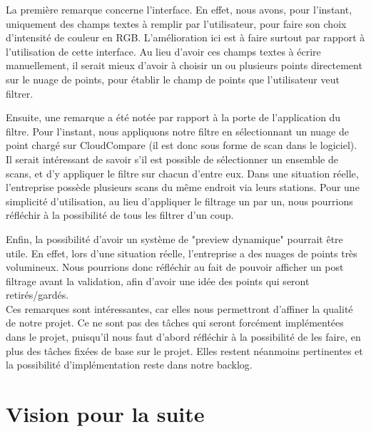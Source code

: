 \documentclass[12pt,titlepage,french]{article}
\begin{document}
La première remarque concerne l'interface. En effet, nous avons, pour l'instant, uniquement des champs textes à remplir par l'utilisateur, pour faire son choix d'intensité de couleur en RGB. L'amélioration ici est à faire surtout par rapport à l'utilisation de cette interface. Au lieu d'avoir ces champs textes à écrire manuellement, il serait mieux d'avoir à choisir un ou plusieurs points directement sur le nuage de points, pour établir le champ de points que l'utilisateur veut filtrer.

Ensuite, une remarque a été notée par rapport à la porte de l'application du filtre. Pour l'instant, nous appliquons notre filtre en sélectionnant un nuage de point chargé sur CloudCompare (il est donc sous forme de scan dans le logiciel). Il serait intéressant de savoir s'il est possible de sélectionner un ensemble de scans, et d'y appliquer le filtre sur chacun d'entre eux. Dans une situation réelle, l'entreprise possède plusieurs scans du même endroit via leurs stations. Pour une simplicité d'utilisation, au lieu d'appliquer le filtrage un par un, nous pourrions réfléchir à la possibilité de tous les filtrer d'un coup.

Enfin, la possibilité d'avoir un système de "preview dynamique" pourrait être utile. En effet, lors d'une situation réelle, l'entreprise a des nuages de points très volumineux. Nous pourrions donc réfléchir au fait de pouvoir afficher un post filtrage avant la validation, afin d'avoir une idée des points qui seront retirés/gardés.\\

Ces remarques sont intéressantes, car elles nous permettront d'affiner la qualité de notre projet. Ce ne sont pas des tâches qui seront forcément implémentées dans le projet, puisqu'il nous faut d'abord réfléchir à la possibilité de les faire, en plus des tâches fixées de base sur le projet. Elles restent néanmoins pertinentes et la possibilité d'implémentation reste dans notre backlog.

\section{Vision pour la suite}

\end{document}
